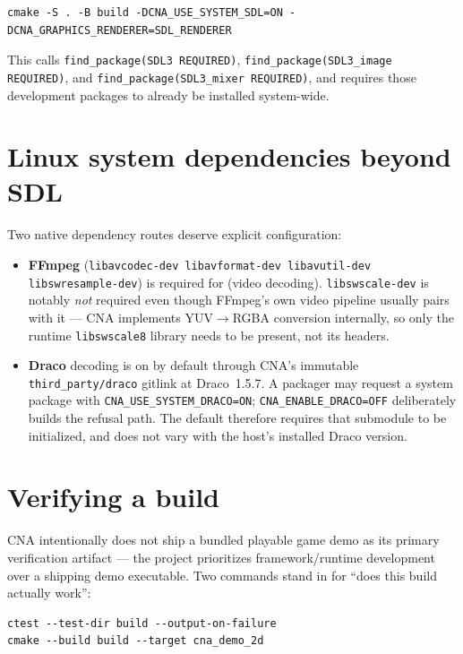 \begin{lstlisting}[style=cnashell]
cmake -S . -B build -DCNA_USE_SYSTEM_SDL=ON -DCNA_GRAPHICS_RENDERER=SDL_RENDERER
\end{lstlisting}

This calls \texttt{find\_package(SDL3 REQUIRED)},
\texttt{find\_package(SDL3\allowbreak{}\_image REQUIRED)}, and
\texttt{find\_package(SDL3\allowbreak{}\_mixer REQUIRED)}, and requires those development
packages to already be installed system-wide.

\section{Linux system dependencies beyond SDL}

Two native dependency routes deserve explicit configuration:

\begin{itemize}
  \item \textbf{FFmpeg} (\texttt{libavcodec-dev libavformat-dev libavutil-dev
        libswresample-dev}) is required for  (video decoding).
        \texttt{libswscale-dev} is notably \emph{not} required even though FFmpeg's own video
        pipeline usually pairs with it --- CNA implements YUV$\to$RGBA conversion internally,
        so only the runtime \texttt{libswscale8} library needs to be present, not its headers.
  \item \textbf{Draco} decoding is on by default through CNA's immutable
        \texttt{third\_party/draco} gitlink at Draco~1.5.7.  A packager may request a system
        package with \texttt{CNA\_USE\_SYSTEM\_DRACO=ON};
        \texttt{CNA\_ENABLE\_DRACO=OFF} deliberately builds the refusal path.  The default
        therefore requires that submodule to be initialized, and does not vary with the host's
        installed Draco version.
\end{itemize}

\section{Verifying a build}

CNA intentionally does not ship a bundled playable game demo as its primary verification
artifact --- the project prioritizes framework/runtime development over a shipping demo
executable. Two commands stand in for ``does this build actually work'':

\begin{lstlisting}[style=cnashell]
ctest --test-dir build --output-on-failure
cmake --build build --target cna_demo_2d
\end{lstlisting}

